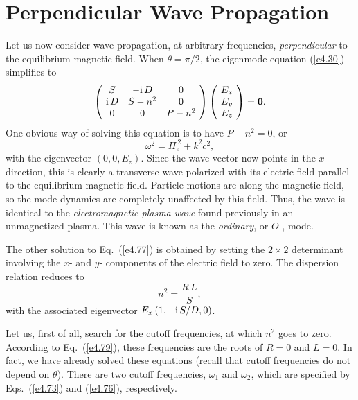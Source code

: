 \section{Perpendicular Wave Propagation}\label{s4.10}
Let us now consider wave propagation, at arbitrary frequencies, {\em perpendicular}\/ 
to the equilibrium magnetic field. When $\theta=\pi/2$, the eigenmode equation
(\ref{e4.30}) simplifies to 
\begin{equation}\label{e4.77}
\left(\!\begin{array}{ccc}
S & -{\rm i}\,D & 0\\
{\rm i} \,D           & S - n^2     & 0 \\
0& 0 & P - n^2
\end{array}\!\right)\left(\!
\begin{array}{c} E_x\\ E_y \\ E_z \end{array}\!\right) = {\bf 0}.
\end{equation}
One obvious way of solving this equation is to have $P-n^2 =0$, or
\begin{equation}\label{e4.78}
\omega^2 = {\Pi}_e^{~2} +k^2c^2,
\end{equation}
with the eigenvector $(0,0,E_z)$. Since the wave-vector now points in the
$x$-direction, this is clearly a transverse wave polarized with its electric
field parallel to the equilibrium magnetic field. Particle motions are
along the magnetic field, so the mode dynamics are completely unaffected  
by this field. Thus, the wave is identical to the 
{\em electromagnetic plasma wave}\/ found
previously in an unmagnetized plasma. This wave is known as the {\em ordinary},
or $O$-, mode. 

The other solution to Eq.~(\ref{e4.77}) is obtained by setting the $2\times 2$ determinant
involving the $x$- and $y$- components of the electric field to zero. The
dispersion relation reduces to 
\begin{equation}\label{e4.79}
n^2 = \frac{R\,L}{S},
\end{equation}
with the associated eigenvector $E_x\,(1,-{\rm i}\,S/D, 0)$. 

Let us, first of all, search for the cutoff frequencies, at which $n^2$ goes to
zero. 
According to Eq.~(\ref{e4.79}), these frequencies are the roots of $R=0$ and $L=0$.
In fact, we have already solved these equations (recall that
cutoff frequencies do not depend on $\theta$). 
There are two cutoff frequencies, $\omega_1$ and $\omega_2$,
which are specified by Eqs.~(\ref{e4.73}) and (\ref{e4.76}), respectively. 

